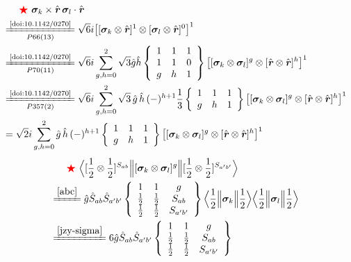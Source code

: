 \documentclass[master]{shnuthesis}
\newcommand{\bmr}{\textbf{\textit{r}}}
\newcommand{\ap}{a^\prime}
\newcommand{\bp}{b^\prime}
\newcommand{\il}{\!\!\!\!\!\!\!\!\!\!}
\newcommand{\zdydh}{\xlongequal}
\newcommand{\redstar}{{\color{red} \bigstar}\,\,}
\begin{document}
\begin{align}
    & \redstar \bm{\sigma}_k \times \hat{\bmr}\, \bm{\sigma}_l \cdot \hat{\bmr} \\
    &\il \zdydh[P66(13)]{\text{\cite{doi:10.1142/0270}}} \sqrt{6}i \big[[\bm{\sigma}_k \otimes \hat{\bmr}]^1 \otimes [\bm{\sigma}_l \otimes \hat{\bmr}]^0\big]^1 \\
    &\il \zdydh[P70(11)]{\text{\cite{doi:10.1142/0270}}} \sqrt{6}i \sum_{g,h=0}^2 \sqrt{3}\hat{g}\hat{h}  \left\{\begin{array}{ccc} 1 & 1 & 1 \\ 1 & 1 & 0 \\ g & h & 1 \end{array}\right\}  \big[[\bm{\sigma}_k \otimes \bm{\sigma}_l]^g \otimes [\hat{\bmr} \otimes \hat{\bmr}]^h\big]^1 \\
    &\il \zdydh[P357(2)]{\text{\cite{doi:10.1142/0270}}} \sqrt{6}i \sum_{g,h=0}^2 \sqrt{3}\,\hat{g}\,\hat{h}\, (-)^{h+1}\frac{1}{3}  \left\{\begin{array}{ccc} 1 & 1 & 1 \\ g & h & 1 \end{array}\right\}  \big[[\bm{\sigma}_k \otimes \bm{\sigma}_l]^g \otimes [\hat{\bmr} \otimes \hat{\bmr}]^h\big]^1 \\
    &\il = \sqrt{2}i \sum_{g,h=0}^2 \hat{g}\,\hat{h}\, (-)^{h+1}  \left\{\begin{array}{ccc} 1 & 1 & 1 \\ g & h & 1 \end{array}\right\}  \big[[\bm{\sigma}_k \otimes \bm{\sigma}_l]^g \otimes [\hat{\bmr} \otimes \hat{\bmr}]^h\big]^1 \label{sigmak-r-sigmal-r}
\end{align}
\begin{align}
    & \redstar \Big\langle [\frac{1}{2}\otimes\frac{1}{2}]^{S_{ab}} \Big\| [\bm{\sigma}_k \otimes \bm{\sigma}_l]^g \Big\| [\frac{1}{2}\otimes\frac{1}{2}]^{S_{\ap\bp}} \Big\rangle \\
    &\il \zdydh{\ref{abc}} \hat{g}\hat{S}_{ab}\hat{S}_{\ap\bp}  \left\{\begin{array}{ccc} 1 & 1 & g \\ \frac{1}{2} & \frac{1}{2} & S_{ab} \\ \frac{1}{2} & \frac{1}{2} & S_{\ap\bp} \end{array}\right\}  \Big\langle \frac{1}{2} \Big\| \bm{\sigma}_k \Big\| \frac{1}{2} \Big\rangle \Big\langle \frac{1}{2} \Big\| \bm{\sigma}_l \Big\| \frac{1}{2} \Big\rangle \\
    &\il \zdydh{\ref{jzy-sigma}} 6\hat{g}\hat{S}_{ab}\hat{S}_{\ap\bp}  \left\{\begin{array}{ccc} 1 & 1 & g \\ \frac{1}{2} & \frac{1}{2} & S_{ab} \\ \frac{1}{2} & \frac{1}{2} & S_{\ap\bp} \end{array}\right\} \label{sigmakl-g}
\end{align}
\end{document}

